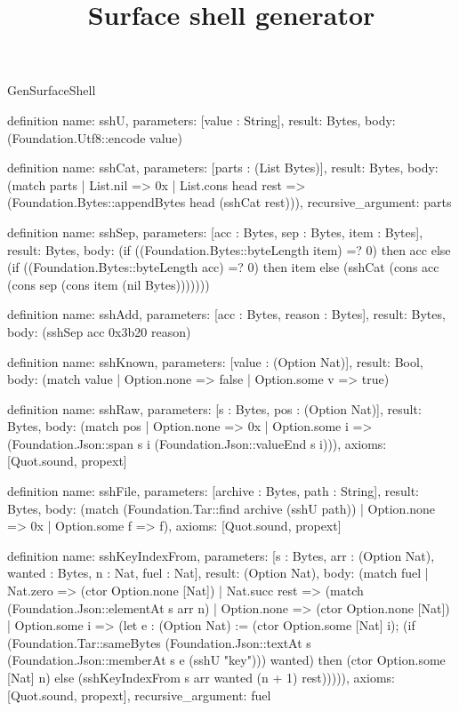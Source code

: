 \begin{lexlean}{GenSurfaceShell}
\title{Surface shell generator}
\begin{semanticmodule}
definition{
  name: sshU,
  parameters: [value : String],
  result: Bytes,
  body: (Foundation.Utf8::encode value)
}

definition{
  name: sshCat,
  parameters: [parts : (List Bytes)],
  result: Bytes,
  body: (match parts
    | List.nil => 0x
    | List.cons head rest => (Foundation.Bytes::appendBytes head (sshCat rest))),
  recursive_argument: parts
}

definition{
  name: sshSep,
  parameters: [acc : Bytes, sep : Bytes, item : Bytes],
  result: Bytes,
  body: (if ((Foundation.Bytes::byteLength item) =? 0) then acc else (if ((Foundation.Bytes::byteLength acc) =? 0) then item else (sshCat (cons acc (cons sep (cons item (nil Bytes)))))))
}

definition{
  name: sshAdd,
  parameters: [acc : Bytes, reason : Bytes],
  result: Bytes,
  body: (sshSep acc 0x3b20 reason)
}

definition{
  name: sshKnown,
  parameters: [value : (Option Nat)],
  result: Bool,
  body: (match value | Option.none => false | Option.some v => true)
}

definition{
  name: sshRaw,
  parameters: [s : Bytes, pos : (Option Nat)],
  result: Bytes,
  body: (match pos
    | Option.none => 0x
    | Option.some i => (Foundation.Json::span s i (Foundation.Json::valueEnd s i))),
  axioms: [Quot.sound, propext]
}

definition{
  name: sshFile,
  parameters: [archive : Bytes, path : String],
  result: Bytes,
  body: (match (Foundation.Tar::find archive (sshU path)) | Option.none => 0x | Option.some f => f),
  axioms: [Quot.sound, propext]
}

definition{
  name: sshKeyIndexFrom,
  parameters: [s : Bytes, arr : (Option Nat), wanted : Bytes, n : Nat, fuel : Nat],
  result: (Option Nat),
  body: (match fuel
    | Nat.zero => (ctor Option.none [Nat])
    | Nat.succ rest => (match (Foundation.Json::elementAt s arr n)
      | Option.none => (ctor Option.none [Nat])
      | Option.some i => (let e : (Option Nat) := (ctor Option.some [Nat] i); (if (Foundation.Tar::sameBytes (Foundation.Json::textAt s (Foundation.Json::memberAt s e (sshU "key"))) wanted) then (ctor Option.some [Nat] n) else (sshKeyIndexFrom s arr wanted (n + 1) rest))))),
  axioms: [Quot.sound, propext],
  recursive_argument: fuel
}


\end{semanticmodule}
\end{lexlean}
